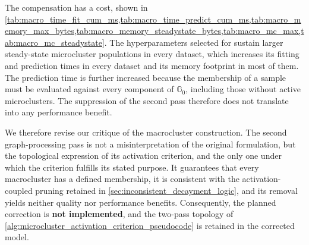 




The compensation has a cost, shown in \cref{tab:macro_time_fit_cum_ms,tab:macro_time_predict_cum_ms,tab:macro_memory_max_bytes,tab:macro_memory_steadystate_bytes,tab:macro_mc_max,tab:macro_mc_steadystate}. The hyperparameters selected for  sustain larger steady-state microcluster populations in every dataset, which increases its fitting and prediction times in every dataset and its memory footprint in most of them. The prediction time is further increased because the membership of a sample must be evaluated against every component of $\mathbb{G}_0$, including those without active microclusters. The suppression of the second pass therefore does not translate into any performance benefit.








We therefore revise our critique of the macrocluster construction. The second graph-processing pass is not a misinterpretation of the original formulation, but the topological expression of its activation criterion, and the only one under which the criterion fulfills its stated purpose. It guarantees that every macrocluster has a defined membership, it is consistent with the activation-coupled pruning retained in \cref{sec:inconsistent_decayment_logic}, and its removal yields neither quality nor performance benefits. Consequently, the planned correction is \textbf{not implemented}, and the two-pass topology of \cref{alg:microcluster_activation_criterion_pseudocode} is retained in the corrected model.

